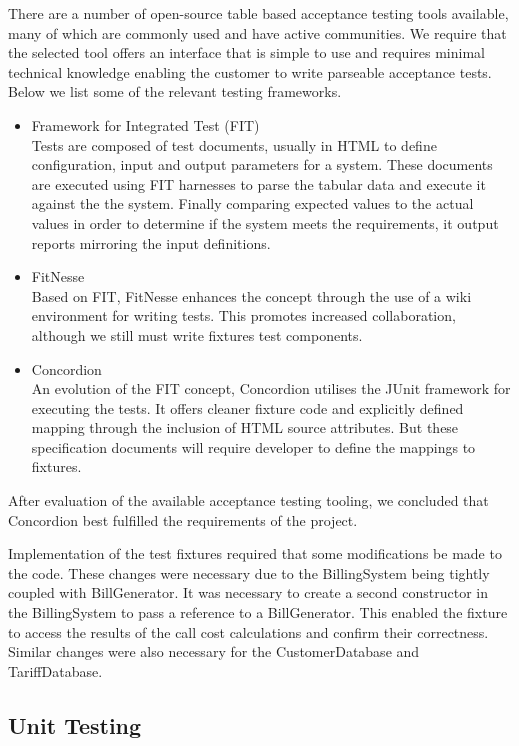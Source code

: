 \documentclass[pdftex,11pt,a4paper]{article}
\begin{document}
There are a number of open-source table based acceptance testing tools available, many of which are commonly used and have active communities. We require that the selected tool offers an interface that is simple to use and requires minimal technical knowledge enabling the customer to write parseable acceptance tests. Below we list some of the relevant testing frameworks.


\begin{itemize}
  \item Framework for Integrated Test (FIT)\\
Tests are composed of test documents, usually in HTML to define configuration, input and output parameters for a system. These documents are executed using FIT harnesses to parse the tabular data and execute it against the the system. Finally comparing expected values to the actual values in order to determine if the system meets the requirements, it output reports mirroring the input definitions. 
  \item FitNesse\\
Based on FIT, FitNesse enhances the concept through the use of a wiki environment for writing tests. This promotes increased collaboration, although we still must write fixtures test components.
  \item Concordion\\
An evolution of the FIT concept, Concordion utilises the JUnit framework for executing the tests. It offers cleaner fixture code and explicitly defined mapping through the inclusion of HTML source attributes. But these specification documents will require developer to define the mappings to fixtures.
\end{itemize}

After evaluation of the available acceptance testing tooling, we concluded that Concordion best fulfilled the requirements of the project. 

Implementation of the test fixtures required that some modifications be made to the code. These changes were necessary due to the BillingSystem being tightly coupled with BillGenerator. It was necessary to create a second constructor in the BillingSystem to pass a reference to a BillGenerator. This enabled the fixture to access the results of the call cost calculations and confirm their correctness. Similar changes were also necessary for the CustomerDatabase and TariffDatabase. 


\subsection{Unit Testing}
\end{document}
